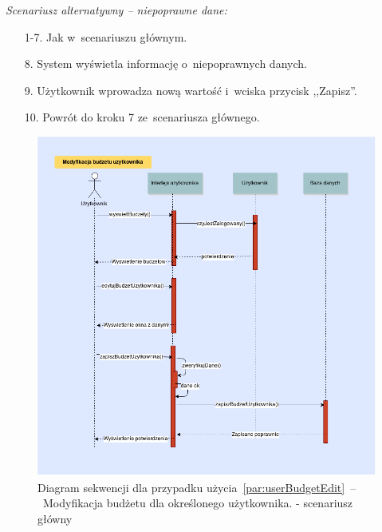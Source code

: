 \textit{Scenariusz alternatywny -- niepoprawne dane:}
\begin{enumerate}
  \item[1-7.] Jak w~scenariuszu głównym.
  \item[8.] System wyświetla informację o~niepoprawnych danych.
  \item[9.] Użytkownik wprowadza nową wartość i~wciska przycisk ,,Zapisz''.
  \item[10.] Powrót do kroku 7 ze~scenariusza głównego.
\end{enumerate}

\begin{figure}[H]
    \includegraphics[width=\textwidth,
    height=0.5\textheight]{images/modyfikacja_budzetu_uzytkownika.png}
    \caption{Diagram sekwencji dla przypadku użycia~\ref{par:userBudgetEdit}~--~Modyfikacja budżetu dla określonego użytkownika.
    - scenariusz główny}
\end{figure}


